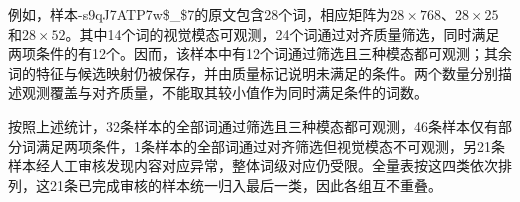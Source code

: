 例如，样本-s9qJ7ATP7w\$\_\$7的原文包含28个词，相应矩阵为$28\times768$、$28\times25$和$28\times52$。其中14个词的视觉模态可观测，24个词通过对齐质量筛选，同时满足两项条件的有12个。因而，该样本中有12个词通过筛选且三种模态都可观测；其余词的特征与候选映射仍被保存，并由质量标记说明未满足的条件。两个数量分别描述观测覆盖与对齐质量，不能取其较小值作为同时满足条件的词数。

按照上述统计，32条样本的全部词通过筛选且三种模态都可观测，46条样本仅有部分词满足两项条件，1条样本的全部词通过对齐筛选但视觉模态不可观测，另21条样本经人工审核发现内容对应异常，整体词级对应仍受限。全量表按这四类依次排列，这21条已完成审核的样本统一归入最后一类，因此各组互不重叠。

\begingroup
\small
\setlength{\tabcolsep}{3pt}
\renewcommand{\arraystretch}{1.16}
